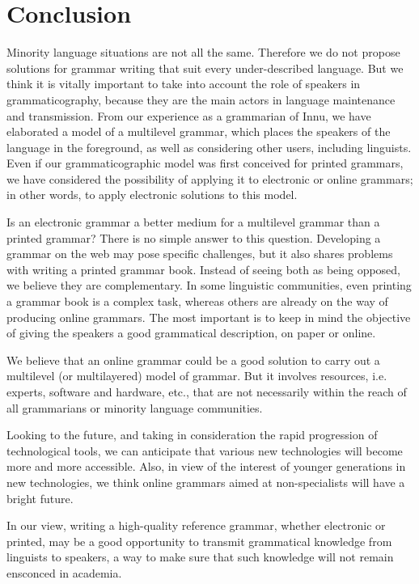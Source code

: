 \section{Conclusion}
Minority language situations are not all the same. Therefore we do not propose solutions for grammar writing that suit every under-described language. But we think it is vitally important to take into account the role of speakers in grammaticography, because they are the main actors in language maintenance and transmission. From our experience as a grammarian of Innu, we have elaborated a model of a multilevel grammar, which places the speakers of the language in the foreground, as well as considering other users, including linguists. Even if our grammaticographic model was first conceived for printed grammars, we have considered the possibility of applying it to electronic or online grammars; in other words, to apply electronic solutions to this model.

Is an electronic grammar a better medium for a multilevel grammar than a printed grammar? There is no simple answer to this question. Developing a grammar on the web may pose specific challenges, but it also shares problems with writing a printed grammar book. Instead of seeing both as being opposed, we believe they are complementary. In some linguistic communities, even printing a grammar book is a complex task, whereas others are already on the way of producing online grammars. The most important is to keep in mind the objective of giving the speakers a good grammatical description, on paper or online.

We believe that an online grammar could be a good solution to carry out a multilevel (or multilayered) model of grammar. But it involves resources, i.e. experts, software and hardware, etc., that are not necessarily within the reach of all grammarians or minority language communities.

Looking to the future, and taking in consideration the rapid progression of technological tools, we can anticipate that various new technologies will become more and more accessible. Also, in view of the interest of younger generations in new technologies, we think online grammars aimed at non-specialists will have a bright future.

In our view, writing a high-quality reference grammar, whether electronic or printed, may be a good opportunity to transmit grammatical knowledge from linguists to speakers, a way to make sure that such knowledge will not remain ensconced in academia.
